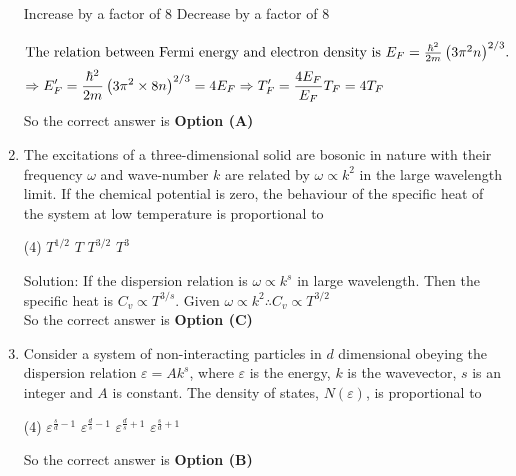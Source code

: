 \begin{enumerate}
\begin{tasks}
		\task[\textbf{C.}] Increase by a factor of 8
		\task[\textbf{D.}]  Decrease by a factor of 8
	\end{tasks}
	\begin{answer}
		\begin{align*}
		\intertext{The relation between Fermi energy and electron density is $E_{F}=\frac{\hbar^{2}}{2 m}\left(3 \pi^{2} n\right)^{2 / 3}$.}
		\Rightarrow E_{F}^{\prime}&=\frac{\hbar^{2}}{2 m}\left(3 \pi^{2} \times 8 n\right)^{2 / 3}=4 E_{F} \Rightarrow T_{F}^{\prime}=\frac{4 E_{F}}{E_{F}} T_{F}=4 T_{F}
		\end{align*}
		So the correct answer is \textbf{Option (A)}
	\end{answer}
	\item The excitations of a three-dimensional solid are bosonic in nature with their frequency $\omega$ and wave-number $k$ are related by $\omega \propto k^{2}$ in the large wavelength limit. If the chemical potential is zero, the behaviour of the specific heat of the system at low temperature is proportional to
	{}
	\begin{tasks}(4)
		\task[\textbf{A.}]  $T^{1 / 2}$
		\task[\textbf{B.}] $T$
		\task[\textbf{C.}] $T^{3 / 2}$
		\task[\textbf{D.}] $T^{3}$
	\end{tasks}
	\begin{answer}$\left. \right. $\\
		Solution: If the dispersion relation is $\omega \propto k^{s}$ in large wavelength. Then the specific heat is $C_{v} \propto T^{3 / s}$. Given $\omega \propto k^{2} \therefore C_{v} \propto T^{3 / 2}$\\
		So the correct answer is \textbf{Option (C)}
	\end{answer}
	\item Consider a system of non-interacting particles in $d$ dimensional obeying the dispersion relation $\varepsilon=A k^{s}$, where $\varepsilon$ is the energy, $k$ is the wavevector, $s$ is an integer and $A$ is constant. The density of states, $N(\varepsilon)$, is proportional to
	{}
	\begin{tasks}(4)
		\task[\textbf{A.}] $\varepsilon^{\frac{s}{d}-1}$
		\task[\textbf{B.}] $\varepsilon^{\frac{d}{s}-1}$
		\task[\textbf{C.}] $\varepsilon^{\frac{d}{s}+1}$
		\task[\textbf{D.}] $\varepsilon^{\frac{s}{d}+1}$
	\end{tasks}
	\begin{answer}
		So the correct answer is \textbf{Option (B)}
	\end{answer}

\end{enumerate}
